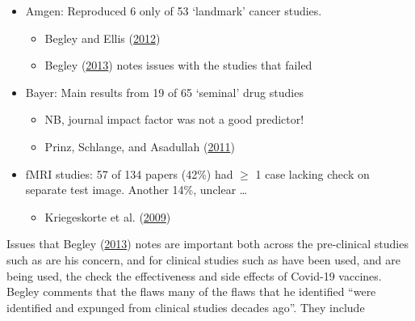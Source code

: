 \documentclass[
  10ptls,
  b5paper]{book}
\providecommand{\tightlist}{%
  \setlength{\itemsep}{0pt}\setlength{\parskip}{0pt}}
\begin{document}
\begin{itemize}
\tightlist
\item
  Amgen: Reproduced 6 only of 53 `landmark' cancer studies.

  \begin{itemize}
  \tightlist
  \item
    Begley and Ellis (\protect\hyperlink{ref-r23_begley_ellis_2012}{2012})
  \item
    Begley (\protect\hyperlink{ref-r2_begley_2013}{2013}) notes issues with the studies that failed
  \end{itemize}
\item
  Bayer: Main results from 19 of 65 `seminal' drug studies

  \begin{itemize}
  \tightlist
  \item
    NB, journal impact factor was not a good predictor!
  \item
    Prinz, Schlange, and Asadullah (\protect\hyperlink{ref-r9_prinz_schlange_asadullah_2011}{2011})
  \end{itemize}
\item
  fMRI studies: 57 of 134 papers (42\%) had \(\geq\) 1 case lacking
  check on separate test image.
  Another 14\%, unclear \ldots{}

  \begin{itemize}
  \tightlist
  \item
    Kriegeskorte et al. (\protect\hyperlink{ref-r8_kriegeskorte_simmons_bellgowan_baker_2009}{2009})
  \end{itemize}
\end{itemize}

Issues that Begley (\protect\hyperlink{ref-r2_begley_2013}{2013}) notes are important both across
the pre-clinical studies such as are his concern, and for
clinical studies such as have been used, and are being used,
the check the effectiveness and side effects of Covid-19
vaccines. Begley comments that the flaws many of the
flaws that he identified ``were identified and expunged from
clinical studies decades ago''. They include
\end{document}
